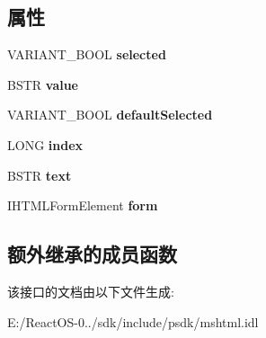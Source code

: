 \subsection*{属性}
\begin{DoxyCompactItemize}
\item 
\mbox{\label{interface_m_s_h_t_m_l_1_1_i_h_t_m_l_option_element_abae1cc564b0dc419eec7e0fdeda39c5f}} 
V\+A\+R\+I\+A\+N\+T\+\_\+\+B\+O\+OL {\bfseries selected}
\item 
\mbox{\label{interface_m_s_h_t_m_l_1_1_i_h_t_m_l_option_element_a06e0fac7dcefd0ca6898491dc9451ea1}} 
B\+S\+TR {\bfseries value}
\item 
\mbox{\label{interface_m_s_h_t_m_l_1_1_i_h_t_m_l_option_element_a499bcef17c66b0ae5539614296cbe269}} 
V\+A\+R\+I\+A\+N\+T\+\_\+\+B\+O\+OL {\bfseries default\+Selected}
\item 
\mbox{\label{interface_m_s_h_t_m_l_1_1_i_h_t_m_l_option_element_a50bc95d635af16c6ed117eff3511aadd}} 
L\+O\+NG {\bfseries index}
\item 
\mbox{\label{interface_m_s_h_t_m_l_1_1_i_h_t_m_l_option_element_a5c2dabddae876d8db1ee48bbf084446b}} 
B\+S\+TR {\bfseries text}
\item 
\mbox{\label{interface_m_s_h_t_m_l_1_1_i_h_t_m_l_option_element_a77c1056bad0a4c6da8a14c88cda70bbe}} 
I\+H\+T\+M\+L\+Form\+Element {\bfseries form}
\end{DoxyCompactItemize}
\subsection*{额外继承的成员函数}


该接口的文档由以下文件生成\+:\begin{DoxyCompactItemize}
\item 
E\+:/\+React\+O\+S-\/0../sdk/include/psdk/mshtml.\+idl\end{DoxyCompactItemize}
